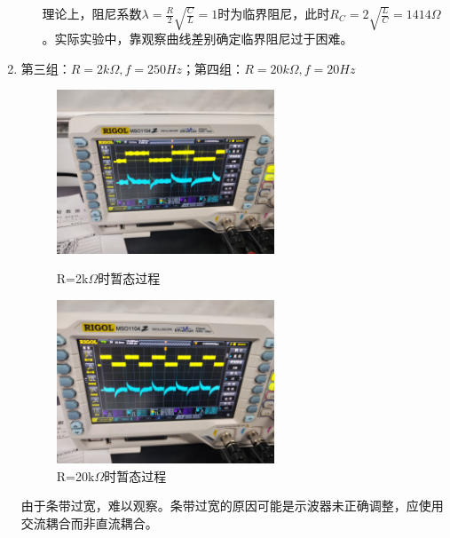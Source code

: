 \documentclass[UTF8]{article}
\begin{document}
\begin{enumerate}
\begin{enumerate}
        \newline \hspace*{2em}理论上，阻尼系数$\lambda=\frac{R}{2} \sqrt{\frac{C}{L}}=1$时为临界阻尼，此时$R_C=2\sqrt{\frac{L}{C}}=1414\Omega$。实际实验中，靠观察曲线差别确定临界阻尼过于困难。
    \end{enumerate}
    \item 第三组：$R=2k\Omega,f=250Hz$；第四组：$R=20k\Omega,f=20Hz$
    \begin{figure}[H]
        \begin{minipage}[t]{0.49\linewidth}
            \centering
            \includegraphics[width=6.5cm]{Fig/14.jpg}
            \caption{R=2k$\Omega$时暂态过程}
        \end{minipage}
        \begin{minipage}[t]{0.49\linewidth}
            \centering
            \includegraphics[width=6.5cm]{Fig/15.jpg}
            \caption{R=20k$\Omega$时暂态过程}
        \end{minipage}
    \end{figure}
    \hspace*{2em}由于条带过宽，难以观察。条带过宽的原因可能是示波器未正确调整，应使用交流耦合而非直流耦合。
\end{enumerate}
\end{document}
